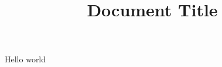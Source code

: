 \documentclass{article}
\begin{document}
\title{Document Title}

\maketitle


Hello world
\end{document}
